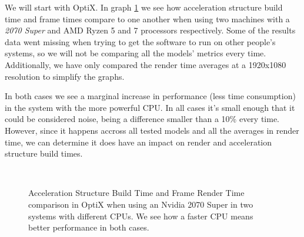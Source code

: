 We will start with OptiX. In graph \ref{optix-2070-super-comparison} we see how acceleration structure build time and frame times compare to one another when using two machines with a \textit{2070 Super} and AMD Ryzen 5 and 7 processors respectively. Some of the results data went missing when trying to get the software to run on other people's systems, so we will not be comparing all the models' metrics every time. Additionally, we have only compared the render time averages at a 1920x1080 resolution to simplify the graphs.

In both cases we see a marginal increase in performance (less time consumption) in the system with the more powerful CPU. In all cases it's small enough that it could be considered noise, being a difference smaller than a 10\% every time. However, since it happens accross all tested models and all the averages in render time, we can determine it does have an impact on render and acceleration structure build times.

\begin{figure}
    \\
    \caption{Acceleration Structure Build Time and Frame Render Time comparison in OptiX when using an Nvidia 2070 Super in two systems with different CPUs. We see how a faster CPU means better performance in both cases.}
    \label{optix-2070-super-comparison}
\end{figure}

